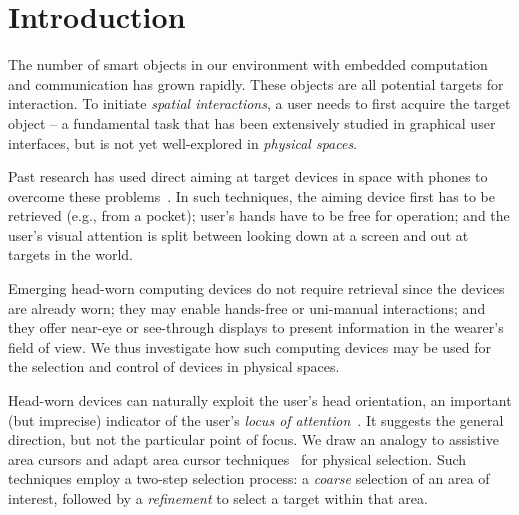 \section{Introduction}

The number of smart objects in our environment with embedded computation and communication has grown rapidly. These objects are all potential targets for interaction. To initiate {\em spatial interactions}, a user needs to first acquire the target object -- a fundamental task that has been extensively studied in graphical user interfaces, but is not yet well-explored in {\em physical spaces}.

%
%
Past research has used direct aiming at target devices in space with phones to overcome these problems~\cite{beigl_point_1999,patel_2-way_2003}. In such techniques, the aiming device first has to be retrieved (e.g., from a pocket); user's hands have to be free for operation; and the user's visual attention is split between looking down at a screen and out at targets in the world. 

Emerging head-worn computing devices do not require retrieval since the devices are already worn; they may enable hands-free or uni-manual interactions; and they offer near-eye or see-through displays to present information in the wearer's field of view. We thus investigate how such computing devices may be used for the selection and control of devices in physical spaces.

Head-worn devices can naturally exploit the user's head orientation, an important (but imprecise) indicator of the user's {\em locus of attention}~\cite{raskin}. It suggests the general direction, but not the particular point of focus. We draw an analogy to assistive area cursors and adapt area cursor techniques~\cite{kabbash1995prince,worden1997making,findlater2010enhanced} for physical selection. Such techniques employ a two-step selection process: a {\em coarse} selection of an area of interest, followed by a {\em refinement} to select a target within that area.

